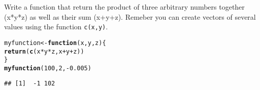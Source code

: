 \documentclass[12pt,a4paper]{scrartcl}\usepackage[]{graphicx}\usepackage[]{color}
\makeatletter
\newcommand{\hlnum}[1]{\textcolor[rgb]{0.686,0.059,0.569}{#1}}%
\newcommand{\hlopt}[1]{\textcolor[rgb]{0,0,0}{#1}}%
\newcommand{\hlstd}[1]{\textcolor[rgb]{0.345,0.345,0.345}{#1}}%
\newcommand{\hlkwa}[1]{\textcolor[rgb]{0.161,0.373,0.58}{\textbf{#1}}}%
\newcommand{\hlkwb}[1]{\textcolor[rgb]{0.69,0.353,0.396}{#1}}%
\newcommand{\hlkwc}[1]{\textcolor[rgb]{0.333,0.667,0.333}{#1}}%
\newcommand{\hlkwd}[1]{\textcolor[rgb]{0.737,0.353,0.396}{\textbf{#1}}}%
\newenvironment{kframe}{%
 \def\at@end@of@kframe{}%
 \ifinner\ifhmode%
  \def\at@end@of@kframe{\end{minipage}}%
  \begin{minipage}{\columnwidth}%
 \fi\fi%
 \def\FrameCommand##1{\hskip\@totalleftmargin \hskip-\fboxsep
 \colorbox{shadecolor}{##1}\hskip-\fboxsep
     \hskip-\linewidth \hskip-\@totalleftmargin \hskip\columnwidth}%
 \MakeFramed {\advance\hsize-\width
   \@totalleftmargin\z@ \linewidth\hsize
   \@setminipage}}%
 {\par\unskip\endMakeFramed%
 \at@end@of@kframe}
\newenvironment{knitrout}{}{} %
\makeatother
\begin{document}
\begin{Exercise}[difficulty=2, title={Multiple values in output}]
Write a function that return the product of three arbitrary numbers together (x*y*z) as well as their sum (x+y+z). Remeber you can create vectors of several values using the function \texttt{c(x,y)}.
\end{Exercise}
\begin{Answer}
\begin{knitrout}
\color{fgcolor}\begin{kframe}
\begin{alltt}
\hlstd{myfunction} \hlkwb{<-} \hlkwa{function}\hlstd{(}\hlkwc{x}\hlstd{,}\hlkwc{y}\hlstd{,}\hlkwc{z}\hlstd{)\{}
  \hlkwd{return}\hlstd{(}\hlkwd{c}\hlstd{(x}\hlopt{*}\hlstd{y}\hlopt{*}\hlstd{z, x}\hlopt{+}\hlstd{y}\hlopt{+}\hlstd{z))}
\hlstd{\}}
\hlkwd{myfunction}\hlstd{(}\hlnum{100}\hlstd{,}\hlnum{2}\hlstd{,} \hlopt{-}\hlnum{0.005}\hlstd{)}
\end{alltt}
\begin{verbatim}
## [1]  -1 102
\end{verbatim}
\end{kframe}
\end{knitrout}
\end{Answer}
\end{document}
